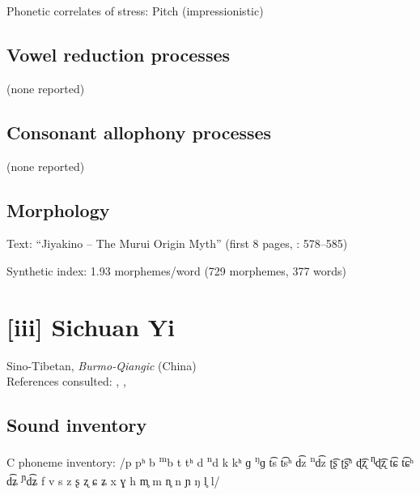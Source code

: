 {\begin{appendixdesc}
\item[Phonetic correlates of stress:] Pitch (impressionistic)
\end{appendixdesc}
\subsection*{Vowel reduction processes}

(none reported)
\subsection*{Consonant allophony processes}

(none reported)

\subsection*{Morphology}

\begin{appendixdesc}

\item[Text:] “Jiyakino -- The Murui Origin Myth” (first 8 pages, \citealt{Wojtylak2017}: 578--585)

\item[Synthetic index:] 1.93 morphemes/word (729 morphemes, 377 words)
\end{appendixdesc}
\section*{[iii] Sichuan Yi} %
Sino-Tibetan, \textit{Burmo-Qiangic} (China)\medskip\\
References consulted: \citet{Gerner2013}, \citet{Maoji1997}, \citet{Merrifield2012}

\subsection*{Sound inventory}
\begin{appendixdesc}

\item[C phoneme inventory:] /p pʰ b \textsuperscript{m}b t tʰ d \textsuperscript{n}d k kʰ ɡ \textsuperscript{ŋ}ɡ t͡s t͡sʰ d͡z \textsuperscript{n}d͡z ʈ͡ʂ ʈ͡ʂʰ ɖ͡ʐ \textsuperscript{ɳ}ɖ͡ʐ t͡ɕ t͡ɕʰ d͡ʑ \textsuperscript{ɲ}d͡ʑ f v s z ʂ ʐ ɕ ʑ x ɣ h m̥ m n̥ n ɲ ŋ l̥ l/


\end{appendixdesc}}

